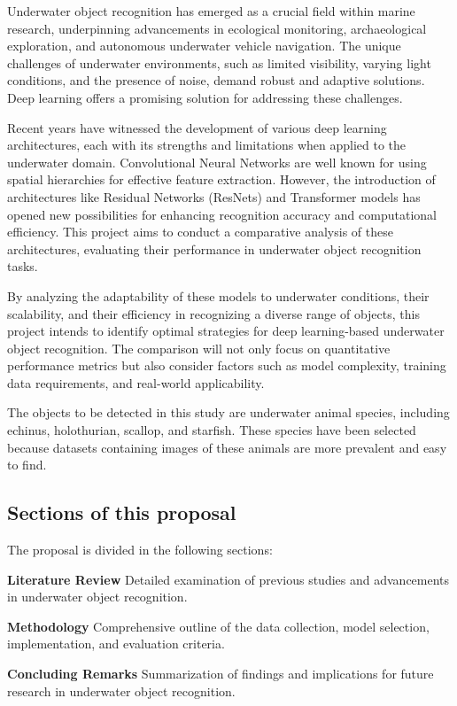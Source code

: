 Underwater object recognition has emerged as a crucial field within marine
research, underpinning advancements in ecological monitoring, archaeological
exploration, and autonomous underwater vehicle navigation.
The unique challenges of underwater environments, such as limited visibility,
varying light conditions, and the presence of noise, demand robust and adaptive
solutions.
Deep learning offers a promising solution for addressing these challenges.

Recent years have witnessed the development of various deep learning
architectures, each with its strengths and limitations when applied to the
underwater domain.
Convolutional Neural Networks are well known for
using spatial hierarchies for effective feature extraction.
However, the introduction of architectures like Residual Networks (ResNets)
and Transformer models has opened new possibilities for enhancing recognition
accuracy and computational efficiency.
This project aims to conduct a comparative analysis of these architectures,
evaluating their performance in underwater object recognition tasks.

By analyzing the adaptability of these models to underwater conditions,
their scalability, and their efficiency in recognizing a diverse range of
objects, this project intends to identify optimal strategies
for deep learning-based underwater object recognition.
The comparison will not only focus on quantitative performance metrics but also
consider factors such as model complexity,
training data requirements, and real-world applicability.

The objects to be detected in this study are underwater animal species,
including echinus, holothurian, scallop, and starfish.
These species have been selected because datasets containing images of
these animals are more prevalent and easy to find.

\subsection{Sections of this proposal}

The proposal is divided in the following sections:

\begin{APAitemize}
    \item \textbf{Literature Review} Detailed examination of previous studies and advancements in underwater object recognition.
    \item \textbf{Methodology} Comprehensive outline of the data collection, model selection, implementation, and evaluation criteria.
    \item \textbf{Concluding Remarks} Summarization of findings and implications for future research in underwater object recognition.
\end{APAitemize}
